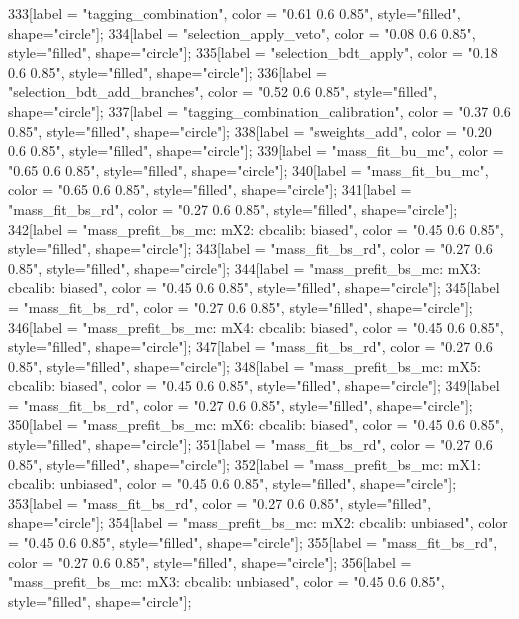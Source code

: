 {	333[label = "tagging_combination", color = "0.61 0.6 0.85", style="filled", shape="circle"];
	334[label = "selection_apply_veto", color = "0.08 0.6 0.85", style="filled", shape="circle"];
	335[label = "selection_bdt_apply", color = "0.18 0.6 0.85", style="filled", shape="circle"];
	336[label = "selection_bdt_add_branches", color = "0.52 0.6 0.85", style="filled", shape="circle"];
	337[label = "tagging_combination_calibration", color = "0.37 0.6 0.85", style="filled", shape="circle"];
	338[label = "sweights_add", color = "0.20 0.6 0.85", style="filled", shape="circle"];
	339[label = "mass_fit_bu_mc", color = "0.65 0.6 0.85", style="filled", shape="circle"];
	340[label = "mass_fit_bu_mc", color = "0.65 0.6 0.85", style="filled", shape="circle"];
	341[label = "mass_fit_bs_rd", color = "0.27 0.6 0.85", style="filled", shape="circle"];
	342[label = "mass_prefit_bs_mc\nmassbin: mX2\nmassmodel: cbcalib\ntrigger: biased", color = "0.45 0.6 0.85", style="filled", shape="circle"];
	343[label = "mass_fit_bs_rd", color = "0.27 0.6 0.85", style="filled", shape="circle"];
	344[label = "mass_prefit_bs_mc\nmassbin: mX3\nmassmodel: cbcalib\ntrigger: biased", color = "0.45 0.6 0.85", style="filled", shape="circle"];
	345[label = "mass_fit_bs_rd", color = "0.27 0.6 0.85", style="filled", shape="circle"];
	346[label = "mass_prefit_bs_mc\nmassbin: mX4\nmassmodel: cbcalib\ntrigger: biased", color = "0.45 0.6 0.85", style="filled", shape="circle"];
	347[label = "mass_fit_bs_rd", color = "0.27 0.6 0.85", style="filled", shape="circle"];
	348[label = "mass_prefit_bs_mc\nmassbin: mX5\nmassmodel: cbcalib\ntrigger: biased", color = "0.45 0.6 0.85", style="filled", shape="circle"];
	349[label = "mass_fit_bs_rd", color = "0.27 0.6 0.85", style="filled", shape="circle"];
	350[label = "mass_prefit_bs_mc\nmassbin: mX6\nmassmodel: cbcalib\ntrigger: biased", color = "0.45 0.6 0.85", style="filled", shape="circle"];
	351[label = "mass_fit_bs_rd", color = "0.27 0.6 0.85", style="filled", shape="circle"];
	352[label = "mass_prefit_bs_mc\nmassbin: mX1\nmassmodel: cbcalib\ntrigger: unbiased", color = "0.45 0.6 0.85", style="filled", shape="circle"];
	353[label = "mass_fit_bs_rd", color = "0.27 0.6 0.85", style="filled", shape="circle"];
	354[label = "mass_prefit_bs_mc\nmassbin: mX2\nmassmodel: cbcalib\ntrigger: unbiased", color = "0.45 0.6 0.85", style="filled", shape="circle"];
	355[label = "mass_fit_bs_rd", color = "0.27 0.6 0.85", style="filled", shape="circle"];
	356[label = "mass_prefit_bs_mc\nmassbin: mX3\nmassmodel: cbcalib\ntrigger: unbiased", color = "0.45 0.6 0.85", style="filled", shape="circle"];
}
